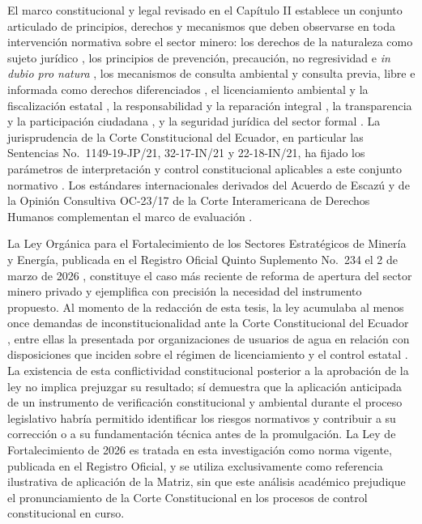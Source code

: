 El marco constitucional y legal revisado en el Capítulo II establece un conjunto articulado de principios, derechos y mecanismos que deben observarse en toda intervención normativa sobre el sector minero: los derechos de la naturaleza como sujeto jurídico \parencite{cre_2008,cce_1149_19_jp_21}, los principios de prevención, precaución, no regresividad e \textit{in dubio pro natura} \parencite{coa_2017,cce_1149_19_jp_21}, los mecanismos de consulta ambiental y consulta previa, libre e informada como derechos diferenciados \parencite{cce_1149_19_jp_21,cce_22_18_in_21}, el licenciamiento ambiental y la fiscalización estatal \parencite{coa_2017,arcom_rendicion_cuentas_2024}, la responsabilidad y la reparación integral \parencite{coa_2017,cedec_guia_2023}, la transparencia y la participación ciudadana \parencite{acuerdo_escazu_2018}, y la seguridad jurídica del sector formal \parencite{villacis_calvas_2022}. La jurisprudencia de la Corte Constitucional del Ecuador, en particular las Sentencias No.\ 1149-19-JP/21, 32-17-IN/21 y 22-18-IN/21, ha fijado los parámetros de interpretación y control constitucional aplicables a este conjunto normativo \parencite{cce_1149_19_jp_21,cce_32_17_in_21,cce_22_18_in_21}. Los estándares internacionales derivados del Acuerdo de Escazú y de la Opinión Consultiva OC-23/17 de la Corte Interamericana de Derechos Humanos complementan el marco de evaluación \parencite{acuerdo_escazu_2018,corte_idh_oc23_2017}.

La Ley Orgánica para el Fortalecimiento de los Sectores Estratégicos de Minería y Energía, publicada en el Registro Oficial Quinto Suplemento No.\ 234 el 2 de marzo de 2026 \parencite{ley_fortalecimiento_2026}, constituye el caso más reciente de reforma de apertura del sector minero privado y ejemplifica con precisión la necesidad del instrumento propuesto. Al momento de la redacción de esta tesis, la ley acumulaba al menos once demandas de inconstitucionalidad ante la Corte Constitucional del Ecuador \parencite{primicias_demandas_2026}, entre ellas la presentada por organizaciones de usuarios de agua en relación con disposiciones que inciden sobre el régimen de licenciamiento y el control estatal \parencite{primicias_demanda_unagua_2026}. La existencia de esta conflictividad constitucional posterior a la aprobación de la ley no implica prejuzgar su resultado; sí demuestra que la aplicación anticipada de un instrumento de verificación constitucional y ambiental durante el proceso legislativo habría permitido identificar los riesgos normativos y contribuir a su corrección o a su fundamentación técnica antes de la promulgación. La Ley de Fortalecimiento de 2026 es tratada en esta investigación como norma vigente, publicada en el Registro Oficial, y se utiliza exclusivamente como referencia ilustrativa de aplicación de la Matriz, sin que este análisis académico prejudique el pronunciamiento de la Corte Constitucional en los procesos de control constitucional en curso.

